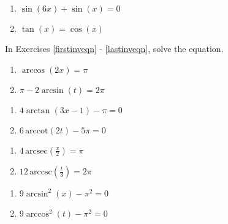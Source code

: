 \documentclass{ximera}
\begin{document}
\begin{multicols}{2}
\begin{enumerate}
\setcounter{enumi}{\value{HW}}

\item $\sin(6x) + \sin(x) = 0$
\item $\tan(x) = \cos(x)$ \label{solvemoreidentlast}

\setcounter{HW}{\value{enumi}}
\end{enumerate}
\end{multicols}

In Exercises \ref{firstinveqn} - \ref{lastinveqn}, solve the equation.

\begin{multicols}{2}
\begin{enumerate}
\setcounter{enumi}{\value{HW}}

\item $\arccos(2x) = \pi$  \label{firstinveqn}  %
\item $\pi - 2\arcsin(t) = 2\pi$   %

\setcounter{HW}{\value{enumi}}
\end{enumerate}
\end{multicols}

\begin{multicols}{2}
\begin{enumerate}
\setcounter{enumi}{\value{HW}}

\item $4\arctan(3x-1)-\pi=0$   %
\item $6 \, \text{arccot}(2t) - 5\pi = 0$   %

\setcounter{HW}{\value{enumi}}
\end{enumerate}
\end{multicols}


\begin{multicols}{2}
\begin{enumerate}
\setcounter{enumi}{\value{HW}}

\item $4 \,\text{arcsec}\left(\frac{x}{2}\right) = \pi$   %
\item $12 \,\text{arccsc}\left(\frac{t}{3}\right) = 2\pi$   %

\setcounter{HW}{\value{enumi}}
\end{enumerate}
\end{multicols}

\begin{multicols}{2}
\begin{enumerate}
\setcounter{enumi}{\value{HW}}

\item $9 \arcsin^{2}(x) - \pi^2 = 0$   %
\item $9 \arccos^{2}(t) - \pi^2 = 0$   %

\setcounter{HW}{\value{enumi}}
\end{enumerate}
\end{multicols}
\end{document}
